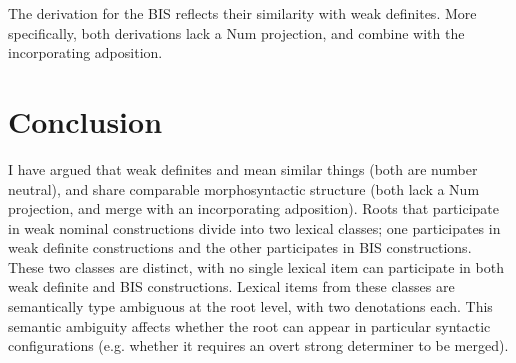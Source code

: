 \documentclass[output=paper,
modfonts
]{langscibook}
\begin{document}
\begin{exe}
\end{exe}

The derivation for the BIS reflects their similarity with weak definites. More specifically, both derivations lack a {Num} projection, and combine with the incorporating adposition. 

\section{Conclusion}\label{sec:williams:6}

I have argued that weak definites and  mean similar things (both are number neutral), and share comparable morphosyntactic structure (both lack a {Num} projection, and merge with an incorporating adposition). Roots that participate in weak nominal constructions divide into two lexical classes; one participates in weak definite constructions and the other participates in BIS constructions. These two classes are distinct, with no single lexical item can participate in both weak definite and BIS constructions. Lexical items from these classes are semantically type ambiguous at the root level, with two denotations each. This semantic ambiguity affects whether the root can appear in particular syntactic configurations (e.g. whether it requires an overt strong determiner to be merged).   
\end{document}
